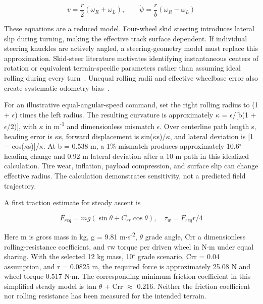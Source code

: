 \documentclass[11pt,letterpaper]{article}
\begin{document}
\begin{equation}
v=\frac{r}{2}(\omega_R+\omega_L),\qquad \dot\psi=\frac{r}{b}(\omega_R-\omega_L)
\label{eq:5}
\end{equation}

These equations are a reduced model. Four-wheel skid steering introduces lateral slip during turning, making the effective track surface dependent. If individual steering knuckles are actively angled, a steering-geometry model must replace this approximation. Skid-steer literature motivates identifying instantaneous centers of rotation or equivalent terrain-specific parameters rather than assuming ideal rolling during every turn~\cite{ENG_SKID}. Unequal rolling radii and effective wheelbase error also create systematic odometry bias~\cite{ENG_ODOM}.

For an illustrative equal-angular-speed command, set the right rolling radius to (1 + \ensuremath{\epsilon}) times the left radius. The resulting curvature is approximately \ensuremath{\kappa} = \ensuremath{\epsilon}/[b(1 + \ensuremath{\epsilon}/2)], with \ensuremath{\kappa} in m\textsuperscript{-}\textsuperscript{1} and dimensionless mismatch \ensuremath{\epsilon}. Over centerline path length s, heading error is \ensuremath{\kappa}s, forward displacement is sin(\ensuremath{\kappa}s)/\ensuremath{\kappa}, and lateral deviation is [1 \ensuremath{-} cos(\ensuremath{\kappa}s)]/\ensuremath{\kappa}. At b = 0.538 m, a 1\% mismatch produces approximately 10.6\ensuremath{{}^{\circ}} heading change and 0.92 m lateral deviation after a 10 m path in this idealized calculation. Tire wear, inflation, payload compression, and surface slip can change effective radius. The calculation demonstrates sensitivity, not a predicted field trajectory.

A first traction estimate for steady ascent is

\begin{equation}
F_{req}=mg(\sin\theta+C_{rr}\cos\theta),\quad \tau_w=F_{req}r/4
\label{eq:6}
\end{equation}

Here m is gross mass in kg, g = 9.81 m\ensuremath{\cdot}s\textsuperscript{-}\textsuperscript{2}, \ensuremath{\theta} grade angle, Crr a dimensionless rolling-resistance coefficient, and \ensuremath{\tau}w torque per driven wheel in N\ensuremath{\cdot}m under equal sharing. With the selected 12 kg mass, 10\ensuremath{{}^{\circ}} grade scenario, Crr = 0.04 assumption, and r = 0.0825 m, the required force is approximately 25.08 N and wheel torque 0.517 N\ensuremath{\cdot}m. The corresponding minimum friction coefficient in this simplified steady model is tan \ensuremath{\theta} + Crr \ensuremath{\approx} 0.216. Neither the friction coefficient nor rolling resistance has been measured for the intended terrain.
\end{document}
